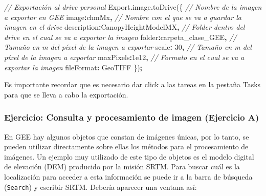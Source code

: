 \documentclass[
  12pt,
  letterpaper,
  twoside]{book}
\newenvironment{Shaded}{\begin{snugshade}}{\end{snugshade}}
\newcommand{\AttributeTok}[1]{\textcolor[rgb]{0.77,0.63,0.00}{#1}}
\newcommand{\CommentTok}[1]{\textcolor[rgb]{0.56,0.35,0.01}{\textit{#1}}}
\newcommand{\DataTypeTok}[1]{\textcolor[rgb]{0.13,0.29,0.53}{#1}}
\newcommand{\DecValTok}[1]{\textcolor[rgb]{0.00,0.00,0.81}{#1}}
\newcommand{\FloatTok}[1]{\textcolor[rgb]{0.00,0.00,0.81}{#1}}
\newcommand{\FunctionTok}[1]{\textcolor[rgb]{0.00,0.00,0.00}{#1}}
\newcommand{\NormalTok}[1]{#1}
\newcommand{\OperatorTok}[1]{\textcolor[rgb]{0.81,0.36,0.00}{\textbf{#1}}}
\newcommand{\StringTok}[1]{\textcolor[rgb]{0.31,0.60,0.02}{#1}}
\begin{document}
\begin{Shaded}
\begin{Highlighting}[]
\CommentTok{// Exportación al drive personal}
\NormalTok{Export}\OperatorTok{.}\AttributeTok{image}\OperatorTok{.}\FunctionTok{toDrive}\NormalTok{(\{}
  \CommentTok{// Nombre de la imagen a exportar en GEE}
  \DataTypeTok{image}\OperatorTok{:}\NormalTok{chmMx}\OperatorTok{,} 
  \CommentTok{// Nombre con el que se va a guardar la imagen en el drive}
  \DataTypeTok{description}\OperatorTok{:}\StringTok{\textquotesingle{}CanopyHeightModelMX\textquotesingle{}}\OperatorTok{,}
  \CommentTok{// Folder dentro del drive en el cual se va a exportar la imagen}
  \DataTypeTok{folder}\OperatorTok{:}\StringTok{\textquotesingle{}carpeta\_clase\_GEE\textquotesingle{}}\OperatorTok{,}
  \CommentTok{// Tamaño en m del píxel de la imagen a exportar}
  \DataTypeTok{scale}\OperatorTok{:} \DecValTok{30}\OperatorTok{,}
  \CommentTok{// Tamaño en m del píxel de la imagen a exportar}
  \DataTypeTok{maxPixels}\OperatorTok{:}\FloatTok{1e12}\OperatorTok{,}
  \CommentTok{// Formato en el cual se va a exportar la imagen}
  \DataTypeTok{fileFormat}\OperatorTok{:} \StringTok{\textquotesingle{}GeoTIFF\textquotesingle{}}
\NormalTok{\})}\OperatorTok{;}
\end{Highlighting}
\end{Shaded}

Es importante recordar que es necesario dar click a las tareas en la pestaña Tasks para que se lleva a cabo la exportación.

\hypertarget{ejercicio-consulta-y-procesamiento-de-imagen-ejercicio-a}{%
\subsubsection{Ejercicio: Consulta y procesamiento de imagen (Ejercicio A)}\label{ejercicio-consulta-y-procesamiento-de-imagen-ejercicio-a}}

En GEE hay algunos objetos que constan de imágenes únicas, por lo tanto, se pueden utilizar directamente sobre ellas los métodos para el procesamiento de imágenes. Un ejemplo muy utilizado de este tipo de objetos es el modelo digital de elevación (DEM) producido por la misión SRTM. Para buscar cuál es la localización para acceder a esta información se puede ir a la barra de búsqueda (\texttt{Search}) y escribir SRTM. Debería aparecer una ventana así:
\end{document}
